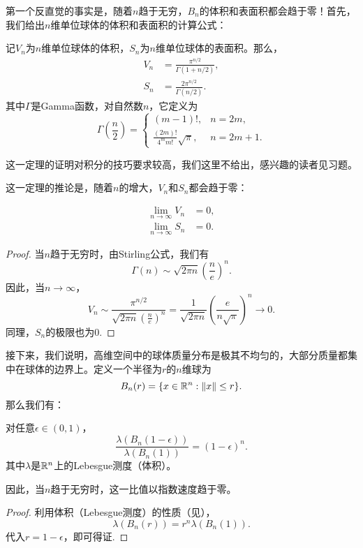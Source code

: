 第一个反直觉的事实是，随着$n$趋于无穷，$B_n$的体积和表面积都会趋于零！首先，我们给出$n$维单位球体的体积和表面积的计算公式：

\begin{theorem}
记$V_n$为$n$维单位球体的体积，$S_n$为$n$维单位球体的表面积。那么，
\begin{align*}
    V_n&=\frac{\pi^{n/2}}{\Gamma(1+n/2)},\\
    S_n&=\frac{2\pi^{n/2}}{\Gamma(n/2)}.
\end{align*}
其中$\Gamma$是Gamma函数，对自然数$n$，它定义为
\[\Gamma\left(\frac{n}{2}\right)=\begin{cases}
    (m-1)!, & n=2m,\\
    \frac{(2m)!}{4^mm!}\sqrt{\pi}, & n=2m+1.
\end{cases}
\]
\end{theorem}
这一定理的证明对积分的技巧要求较高，我们这里不给出，感兴趣的读者见习题。

这一定理的推论是，随着$n$的增大，$V_n$和$S_n$都会趋于零：

\begin{corollary}
\begin{align*}
    \lim_{n\to\infty} V_n&=0,\\
    \lim_{n\to\infty} S_n&=0.
\end{align*}
\end{corollary}
\begin{proof}
    当$n$趋于无穷时，由Stirling公式，我们有
        \[\Gamma(n)\sim\sqrt{2\pi n}\left(\frac{n}{e}\right)^n.\]
    因此，当$n\to\infty$，
    \[V_n\sim\frac{\pi^{n/2}}{\sqrt{2\pi n}\left(\frac{n}{e}\right)^n}=\frac{1}{\sqrt{2\pi n}}\left(\frac{e}{n\sqrt{\pi}}\right)^n\to 0.\]
    同理，$S_n$的极限也为$0$.
\end{proof}

接下来，我们说明，高维空间中的球体质量分布是极其不均匀的，大部分质量都集中在球体的边界上。定义一个半径为$r$的$n$维球为
\[B_n(r) = \{x \in \mathbb{R}^n: \left\|x\right\| \leq r\}.\]
那么我们有：
\begin{proposition}
对任意$\epsilon\in(0,1)$，
\[\frac{\lambda(B_n(1-\epsilon))}{\lambda(B_n(1))}=(1-\epsilon)^n.\]
其中$\lambda$是$\mathbb{R}^n$上的Lebesgue测度（体积）。

因此，当$n$趋于无穷时，这一比值以指数速度趋于零。
\end{proposition}
\begin{proof}
    利用体积（Lebesgue测度）的性质（见），
    \[\lambda(B_n(r))=r^n\lambda(B_n(1)).\]
    代入$r=1-\epsilon$，即可得证.
\end{proof}

